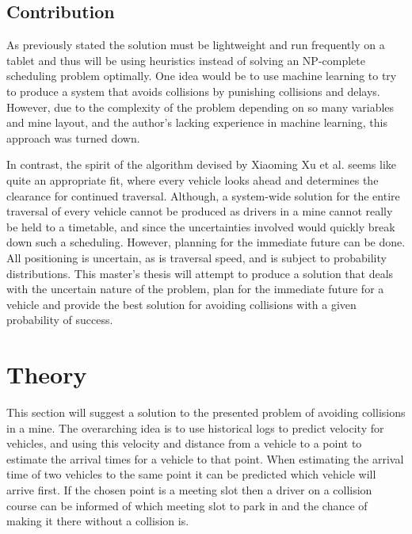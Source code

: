 \documentclass{article}
\begin{document}

		\subsection{Contribution}
			As previously stated the solution must be lightweight and run frequently on a tablet and thus will be using heuristics instead of solving an NP-complete scheduling problem optimally. One idea would be to use machine learning to try to produce a system that avoids collisions by punishing collisions and delays. However, due to the complexity of the problem depending on so many variables and mine layout, and the author's lacking experience in machine learning, this approach was turned down.

			In contrast, the spirit of the algorithm devised by Xiaoming Xu et al. seems like quite an appropriate fit, where every vehicle looks ahead and determines the clearance for continued traversal. Although, a system-wide solution for the entire traversal of every vehicle cannot be produced as drivers in a mine cannot really be held to a timetable, and since the uncertainties involved would quickly break down such a scheduling. However, planning for the immediate future can be done. All positioning is uncertain, as is traversal speed, and is subject to probability distributions. This master's thesis will attempt to produce a solution that deals with the uncertain nature of the problem, plan for the immediate future for a vehicle and provide the best solution for avoiding collisions with a given probability of success.

    \section{Theory}
		This section will suggest a solution to the presented problem of avoiding collisions in a mine. The overarching idea is to use historical logs to predict velocity for vehicles, and using this velocity and distance from a vehicle to a point to estimate the arrival times for a vehicle to that point. When estimating the arrival time of two vehicles to the same point it can be predicted which vehicle will arrive first. If the chosen point is a meeting slot then a driver on a collision course can be informed of which meeting slot to park in and the chance of making it there without a collision is.
\end{document}
